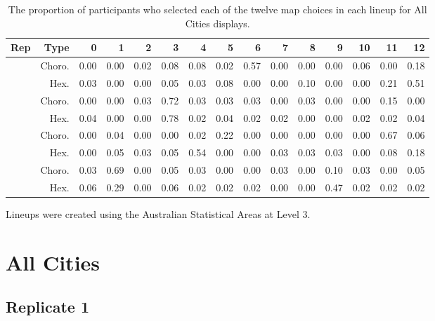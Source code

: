 \documentclass{monashthesis}
\begin{document}
\begin{table}

\caption{\label{tab:choice-all}The proportion of participants who selected each of the twelve map choices in each lineup for All Cities displays.}
\centering
\begin{tabular}[t]{rrrrrrrrrrrrrrr}
\toprule
Rep & Type & 0 & 1 & 2 & 3 & 4 & 5 & 6 & 7 & 8 & 9 & 10 & 11 & 12\\
\midrule
 & Choro. & 0.00 & 0.00 & 0.02 & 0.08 & 0.08 & 0.02 & 0.57 & 0.00 & 0.00 & 0.00 & 0.06 & 0.00 & 0.18\\
\cmidrule{2-15}
\multirow{-2}{*}{\raggedleft\arraybackslash 1} & Hex. & 0.03 & 0.00 & 0.00 & 0.05 & 0.03 & 0.08 & 0.00 & 0.00 & 0.10 & 0.00 & 0.00 & 0.21 & 0.51\\
\cmidrule{1-15}
 & Choro. & 0.00 & 0.00 & 0.03 & 0.72 & 0.03 & 0.03 & 0.03 & 0.00 & 0.03 & 0.00 & 0.00 & 0.15 & 0.00\\
\cmidrule{2-15}
\multirow{-2}{*}{\raggedleft\arraybackslash 2} & Hex. & 0.04 & 0.00 & 0.00 & 0.78 & 0.02 & 0.04 & 0.02 & 0.02 & 0.00 & 0.00 & 0.02 & 0.02 & 0.04\\
\cmidrule{1-15}
 & Choro. & 0.00 & 0.04 & 0.00 & 0.00 & 0.02 & 0.22 & 0.00 & 0.00 & 0.00 & 0.00 & 0.00 & 0.67 & 0.06\\
\cmidrule{2-15}
\multirow{-2}{*}{\raggedleft\arraybackslash 3} & Hex. & 0.00 & 0.05 & 0.03 & 0.05 & 0.54 & 0.00 & 0.00 & 0.03 & 0.03 & 0.03 & 0.00 & 0.08 & 0.18\\
\cmidrule{1-15}
 & Choro. & 0.03 & 0.69 & 0.00 & 0.05 & 0.03 & 0.00 & 0.00 & 0.03 & 0.00 & 0.10 & 0.03 & 0.00 & 0.05\\
\cmidrule{2-15}
\multirow{-2}{*}{\raggedleft\arraybackslash 4} & Hex. & 0.06 & 0.29 & 0.00 & 0.06 & 0.02 & 0.02 & 0.02 & 0.00 & 0.00 & 0.47 & 0.02 & 0.02 & 0.02\\
\bottomrule
\end{tabular}
\end{table}

Lineups were created using the Australian Statistical Areas at Level 3.

\hypertarget{all-cities}{%
\section{All Cities}\label{all-cities}}

\hypertarget{replicate-1}{%
\subsection{Replicate 1}\label{replicate-1}}
\end{document}

